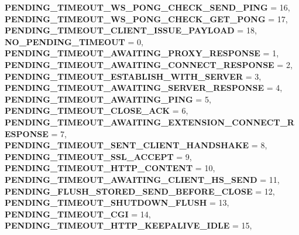 \begin{DoxyCompactItemize}
{\bfseries P\+E\+N\+D\+I\+N\+G\+\_\+\+T\+I\+M\+E\+O\+U\+T\+\_\+\+W\+S\+\_\+\+P\+O\+N\+G\+\_\+\+C\+H\+E\+C\+K\+\_\+\+S\+E\+N\+D\+\_\+\+P\+I\+NG} = 16, 
{\bfseries P\+E\+N\+D\+I\+N\+G\+\_\+\+T\+I\+M\+E\+O\+U\+T\+\_\+\+W\+S\+\_\+\+P\+O\+N\+G\+\_\+\+C\+H\+E\+C\+K\+\_\+\+G\+E\+T\+\_\+\+P\+O\+NG} = 17, 
{\bfseries P\+E\+N\+D\+I\+N\+G\+\_\+\+T\+I\+M\+E\+O\+U\+T\+\_\+\+C\+L\+I\+E\+N\+T\+\_\+\+I\+S\+S\+U\+E\+\_\+\+P\+A\+Y\+L\+O\+AD} = 18, 
\newline
{\bfseries N\+O\+\_\+\+P\+E\+N\+D\+I\+N\+G\+\_\+\+T\+I\+M\+E\+O\+UT} = 0, 
{\bfseries P\+E\+N\+D\+I\+N\+G\+\_\+\+T\+I\+M\+E\+O\+U\+T\+\_\+\+A\+W\+A\+I\+T\+I\+N\+G\+\_\+\+P\+R\+O\+X\+Y\+\_\+\+R\+E\+S\+P\+O\+N\+SE} = 1, 
{\bfseries P\+E\+N\+D\+I\+N\+G\+\_\+\+T\+I\+M\+E\+O\+U\+T\+\_\+\+A\+W\+A\+I\+T\+I\+N\+G\+\_\+\+C\+O\+N\+N\+E\+C\+T\+\_\+\+R\+E\+S\+P\+O\+N\+SE} = 2, 
{\bfseries P\+E\+N\+D\+I\+N\+G\+\_\+\+T\+I\+M\+E\+O\+U\+T\+\_\+\+E\+S\+T\+A\+B\+L\+I\+S\+H\+\_\+\+W\+I\+T\+H\+\_\+\+S\+E\+R\+V\+ER} = 3, 
\newline
{\bfseries P\+E\+N\+D\+I\+N\+G\+\_\+\+T\+I\+M\+E\+O\+U\+T\+\_\+\+A\+W\+A\+I\+T\+I\+N\+G\+\_\+\+S\+E\+R\+V\+E\+R\+\_\+\+R\+E\+S\+P\+O\+N\+SE} = 4, 
{\bfseries P\+E\+N\+D\+I\+N\+G\+\_\+\+T\+I\+M\+E\+O\+U\+T\+\_\+\+A\+W\+A\+I\+T\+I\+N\+G\+\_\+\+P\+I\+NG} = 5, 
{\bfseries P\+E\+N\+D\+I\+N\+G\+\_\+\+T\+I\+M\+E\+O\+U\+T\+\_\+\+C\+L\+O\+S\+E\+\_\+\+A\+CK} = 6, 
{\bfseries P\+E\+N\+D\+I\+N\+G\+\_\+\+T\+I\+M\+E\+O\+U\+T\+\_\+\+A\+W\+A\+I\+T\+I\+N\+G\+\_\+\+E\+X\+T\+E\+N\+S\+I\+O\+N\+\_\+\+C\+O\+N\+N\+E\+C\+T\+\_\+\+R\+E\+S\+P\+O\+N\+SE} = 7, 
\newline
{\bfseries P\+E\+N\+D\+I\+N\+G\+\_\+\+T\+I\+M\+E\+O\+U\+T\+\_\+\+S\+E\+N\+T\+\_\+\+C\+L\+I\+E\+N\+T\+\_\+\+H\+A\+N\+D\+S\+H\+A\+KE} = 8, 
{\bfseries P\+E\+N\+D\+I\+N\+G\+\_\+\+T\+I\+M\+E\+O\+U\+T\+\_\+\+S\+S\+L\+\_\+\+A\+C\+C\+E\+PT} = 9, 
{\bfseries P\+E\+N\+D\+I\+N\+G\+\_\+\+T\+I\+M\+E\+O\+U\+T\+\_\+\+H\+T\+T\+P\+\_\+\+C\+O\+N\+T\+E\+NT} = 10, 
{\bfseries P\+E\+N\+D\+I\+N\+G\+\_\+\+T\+I\+M\+E\+O\+U\+T\+\_\+\+A\+W\+A\+I\+T\+I\+N\+G\+\_\+\+C\+L\+I\+E\+N\+T\+\_\+\+H\+S\+\_\+\+S\+E\+ND} = 11, 
\newline
{\bfseries P\+E\+N\+D\+I\+N\+G\+\_\+\+F\+L\+U\+S\+H\+\_\+\+S\+T\+O\+R\+E\+D\+\_\+\+S\+E\+N\+D\+\_\+\+B\+E\+F\+O\+R\+E\+\_\+\+C\+L\+O\+SE} = 12, 
{\bfseries P\+E\+N\+D\+I\+N\+G\+\_\+\+T\+I\+M\+E\+O\+U\+T\+\_\+\+S\+H\+U\+T\+D\+O\+W\+N\+\_\+\+F\+L\+U\+SH} = 13, 
{\bfseries P\+E\+N\+D\+I\+N\+G\+\_\+\+T\+I\+M\+E\+O\+U\+T\+\_\+\+C\+GI} = 14, 
{\bfseries P\+E\+N\+D\+I\+N\+G\+\_\+\+T\+I\+M\+E\+O\+U\+T\+\_\+\+H\+T\+T\+P\+\_\+\+K\+E\+E\+P\+A\+L\+I\+V\+E\+\_\+\+I\+D\+LE} = 15, 

\end{DoxyCompactItemize}
